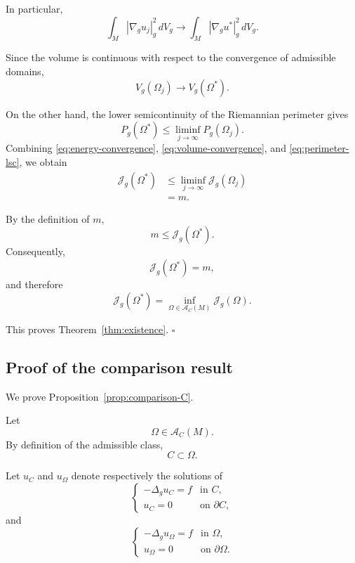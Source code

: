 \documentclass{article}
\renewcommand{\boxed}[1]{#1}
\begin{document}
In particular,
\begin{equation}
\int_M
|\nabla_g u_j|_g^2\,dV_g
\longrightarrow
\int_M
|\nabla_g u^\ast|_g^2\,dV_g.
\label{eq:energy-convergence}
\end{equation}

Since the volume is continuous with respect to the convergence of
admissible domains,
\begin{equation}
V_g(\Omega_j)
\longrightarrow
V_g(\Omega^\ast).
\label{eq:volume-convergence}
\end{equation}

On the other hand, the lower semicontinuity of the Riemannian
perimeter gives
\begin{equation}
P_g(\Omega^\ast)
\leq
\liminf_{j\to\infty}
P_g(\Omega_j).
\label{eq:perimeter-lsc-proof}
\end{equation}
Combining
\eqref{eq:energy-convergence},
\eqref{eq:volume-convergence}, and
\eqref{eq:perimeter-lsc}, we obtain
\begin{align}
\mathcal J_g(\Omega^\ast)
&\leq
\liminf_{j\to\infty}
\mathcal J_g(\Omega_j)
\nonumber\\
&=
m.
\label{eq:liminf-functional}
\end{align}

By the definition of $m$,
\[
m\leq\mathcal J_g(\Omega^\ast).
\]
Consequently,
\[
\mathcal J_g(\Omega^\ast)=m,
\]
and therefore
\[
\boxed{
\mathcal J_g(\Omega^\ast)
=
\inf_{\Omega\in\mathcal A_C(M)}
\mathcal J_g(\Omega).
}
\]

This proves Theorem~\ref{thm:existence}.
\hfill$\square$

\subsection{Proof of the comparison result}
\label{subsec:proof-comparison}

We prove Proposition~\ref{prop:comparison-C}.

Let
\[
\Omega\in\mathcal A_C(M).
\]
By definition of the admissible class,
\[
C\subset\Omega.
\]

Let $u_C$ and $u_\Omega$ denote respectively the solutions of
\begin{equation}
\begin{cases}
-\Delta_g u_C=f & \text{in }C,\\
u_C=0 & \text{on }\partial C,
\end{cases}
\label{eq:proof-state-C}
\end{equation}
and
\begin{equation}
\begin{cases}
-\Delta_g u_\Omega=f & \text{in }\Omega,\\
u_\Omega=0 & \text{on }\partial\Omega.
\end{cases}
\label{eq:proof-state-Omega}
\end{equation}
\end{document}
